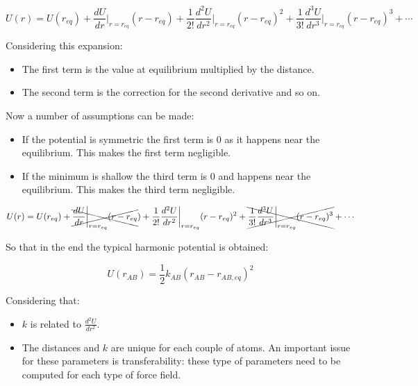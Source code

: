 	$$U(r)=U(r_{eq}) + \frac{dU}{dr}\biggr\vert_{r=r_{eq}}(r-r_{eq})+\frac{1}{2!}\frac{d^2U}{dr^2}\biggr\vert_{r=r_{eq}}(r-r_{eq})^2+\frac{1}{3!}\frac{d^3U}{dr^3}\biggr\vert_{r=r_{eq}}(r-r_{eq})^3+\cdots$$

	Considering this expansion:

	\begin{multicols}{2}
	  \begin{itemize}
	    \item The first term is the value at equilibrium multiplied by the distance.
			\item The second term is the correction for the second derivative and so on.
	  \end{itemize}
	\end{multicols}

	Now a number of assumptions can be made:

	\begin{multicols}{2}
	  \begin{itemize}
	    \item If the potential is symmetric the first term is $0$ as it happens near the equilibrium.
				This makes the first term negligible.
			\item If the minimum is shallow the third term is $0$ and happens near the equilibrium.
				This makes the third term negligible.
	  \end{itemize}
	\end{multicols}

	\begin{align*}
		U(r)&=U(r_{eq}) + \xcancel{\frac{dU}{dr}\biggr\vert_{r=r_{eq}}(r-r_{eq}})+\frac{1}{2!}\frac{d^2U}{dr^2}\biggr\vert_{r=r_{eq}}(r-r_{eq})^2+\xcancel{\frac{1}{3!}\frac{d^3U}{dr^3}\biggr\vert_{r=r_{eq}}(r-r_{eq})^3}+\cdots\\
	\end{align*}

	So that in the end the typical harmonic potential is obtained:

	$$U(r_{AB}) = \frac{1}{2}k_{AB}(r_{AB}-r_{AB,eq})^2$$

	Considering that:

	\begin{multicols}{2}
	  \begin{itemize}
			\item $k$ is related to $\frac{d^2 U}{dr^2}$.
			\item The distances and $k$ are unique for each couple of atoms.
				An important issue for these parameters is transferability: these type of parameters need to be computed for each type of force field.
	  \end{itemize}
	\end{multicols}

